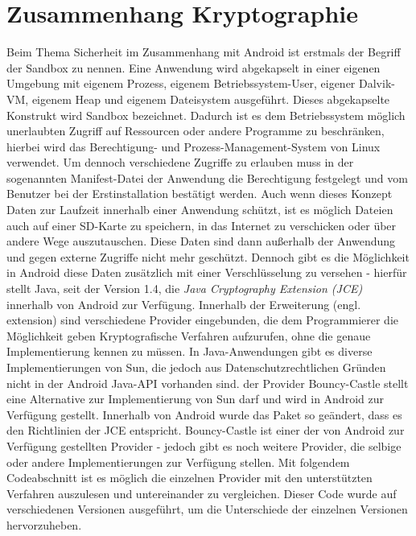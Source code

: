 \documentclass[10pt, a4paper,headsepline]{scrreprt}
\begin{document}
\section{Zusammenhang Kryptographie}
Beim Thema Sicherheit im Zusammenhang mit Android ist erstmals der Begriff der Sandbox zu nennen. Eine Anwendung wird abgekapselt in einer eigenen Umgebung mit eigenem Prozess, eigenem Betriebssystem-User, eigener Dalvik-VM, eigenem Heap und eigenem Dateisystem ausgeführt. Dieses abgekapselte Konstrukt wird Sandbox bezeichnet. Dadurch ist es dem Betriebssystem möglich unerlaubten Zugriff auf Ressourcen oder andere Programme zu beschränken, hierbei wird das Berechtigung- und Prozess-Management-System von Linux verwendet. \citep[S. 33]{book:android44} 
Um dennoch verschiedene Zugriffe zu erlauben muss in der sogenannten Manifest-Datei der Anwendung die Berechtigung festgelegt und vom Benutzer bei der Erstinstallation bestätigt werden.
Auch wenn dieses Konzept Daten zur Laufzeit innerhalb einer Anwendung schützt, ist es möglich Dateien auch auf einer SD-Karte zu speichern, in das Internet zu verschicken oder über andere Wege auszutauschen. Diese Daten sind dann außerhalb der Anwendung und gegen externe Zugriffe nicht mehr geschützt.
Dennoch gibt es die Möglichkeit in Android diese Daten zusätzlich mit einer Verschlüsselung zu versehen - hierfür stellt Java, seit der Version 1.4, die \textit{Java Cryptography Extension (JCE)} innerhalb von Android zur Verfügung. Innerhalb der Erweiterung (engl. extension) sind verschiedene Provider eingebunden, die dem Programmierer die Möglichkeit geben Kryptografische Verfahren aufzurufen, ohne die genaue Implementierung kennen zu müssen. In Java-Anwendungen gibt es diverse Implementierungen von Sun, die jedoch aus Datenschutzrechtlichen Gründen nicht in der Android Java-API vorhanden sind. der Provider Bouncy-Castle stellt eine Alternative zur Implementierung von Sun darf und wird in Android zur Verfügung gestellt. Innerhalb von Android wurde das Paket so geändert, dass es den Richtlinien der JCE entspricht. 
Bouncy-Castle ist einer der von Android zur Verfügung gestellten Provider - jedoch gibt es noch weitere Provider, die selbige oder andere Implementierungen zur Verfügung stellen. Mit folgendem Codeabschnitt ist es möglich die einzelnen Provider mit den unterstützten Verfahren auszulesen und untereinander zu vergleichen. Dieser Code wurde auf verschiedenen Versionen ausgeführt, um die Unterschiede der einzelnen Versionen hervorzuheben. \\
\end{document}
